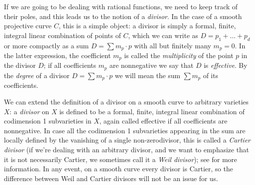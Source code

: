 If we are going to be dealing with rational functions, we need to keep track of their poles, and this leads us to the notion of a \emph{divisor}. In the case of a smooth projective curve $C$, this is a simple object: a divisor is simply a formal, finite, integral linear combination of points of $C$, which we can write as $D = p_1+\dots+p_d$ or more compactly as a sum $D = \sum m_p\cdot p$ with all but finitely many $m_p=0$.  In the latter expression, the coefficient $m_p$ is called the \emph{multiplicity} of the point $p$ in the divisor $D$; if all coefficients $m_p$ are nonnegative we say that $D$ is \emph{effective}. By the \emph{degree} of a divisor $D = \sum m_p\cdot p$ we will mean the sum $\sum m_p$ of its coefficients.

We can extend the definition of a divisor on a smooth curve to arbitrary varieties $X$: a \emph{divisor} on $X$ is defined to be a formal, finite, integral linear combination of codimension 1 subvarieties in $X$, again called effective if all coefficients are nonnegative. In case all the codimension 1 subvarieties appearing in the sum are locally defined by the vanishing of a single non-zerodivisor, this is called a \emph{Cartier divisor} (if we're dealing with an arbitrary divisor, and we want to emphasize that it is not necessarily Cartier, we sometimes call it a \emph{Weil divisor}); see \cite[pp. 140-146]{H} for more information. In any event, on a smooth curve every divisor is Cartier, so the difference between Weil and Cartier divisors will not be an issue for us.

%
%
%
%

